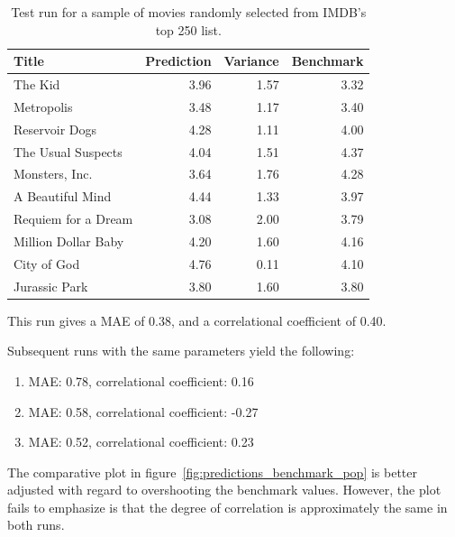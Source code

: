 \begin{table}[h]
  \begin{center}
    \begin{tabular}{|l|rr|r|}
      \hline
      \textbf{Title} & \textbf{Prediction} & \textbf{Variance} & \textbf{Benchmark} \\
      \hline
      The Kid             & 3.96 & 1.57 & 3.32 \\
      Metropolis          & 3.48 & 1.17 & 3.40 \\
      Reservoir Dogs      & 4.28 & 1.11 & 4.00 \\
      The Usual Suspects  & 4.04 & 1.51 & 4.37 \\
      Monsters, Inc.      & 3.64 & 1.76 & 4.28 \\
      A Beautiful Mind    & 4.44 & 1.33 & 3.97 \\
      Requiem for a Dream & 3.08 & 2.00 & 3.79 \\
      Million Dollar Baby & 4.20 & 1.60 & 4.16 \\
      City of God         & 4.76 & 0.11 & 4.10 \\
      Jurassic Park       & 3.80 & 1.60 & 3.80 \\
      \hline
    \end{tabular}
  \end{center}
  \caption{Test run for a sample of movies randomly selected from IMDB's top 250 list.}
  \label{tab:test_run_popular}
\end{table}

This run gives a MAE of 0.38, and a correlational coefficient of 0.40.

Subsequent runs with the same parameters yield the following:

\begin{enumerate}
  \item MAE: 0.78, correlational coefficient: 0.16
  \item MAE: 0.58, correlational coefficient: -0.27
  \item MAE: 0.52, correlational coefficient: 0.23
\end{enumerate}

The comparative plot in figure~\ref{fig:predictions_benchmark_pop} is better adjusted with regard to overshooting the benchmark values. However, the plot fails to emphasize is that the degree of correlation is approximately the same in both runs.


